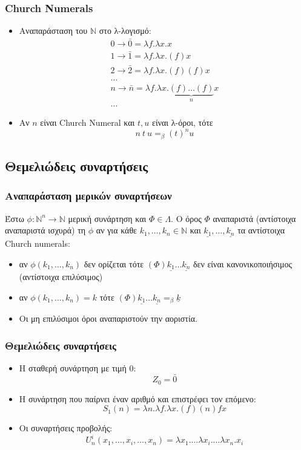 \documentclass{beamer}
\begin{document}
\begin{frame}
  \frametitle{Church Numerals}
  \begin{itemize}
  \item Αναπαράσταση του $ \mathbb{N} $ στο λ-λογισμό:
    \pause
    $$
    \begin{array}{l}
      0 \rightarrow \bar{0} = \lambda f . \lambda x . x \\
      1 \rightarrow \bar{1} = \lambda f . \lambda x . (f) x \\
      2 \rightarrow \bar{2} = \lambda f . \lambda x . (f) (f) x \\
      \ldots \\
      n \rightarrow \bar{n} = \lambda f . \lambda x . \underbrace{(f)
        \ldots (f)}_n x \\
      \ldots
    \end{array}
    $$
    \pause
  \item Αν $n $ είναι Church Numeral και $t, u$ είναι λ-όροι, τότε
    $$ n\:t\:u =_\beta (t)^n u $$
  \end{itemize}
\end{frame}

\subsection{Θεμελιώδεις συναρτήσεις}

\begin{frame}
  \frametitle{Αναπαράσταση μερικών συναρτήσεων}
  Έστω $\phi : \mathbb{N}^n \rightarrow \mathbb{N}$ μερική συνάρτηση
  και $\Phi \in \Lambda $. O όρος $\Phi$ αναπαριστά (αντίστοιχα
  αναπαριστά ισχυρά) τη $\phi$ αν για κάθε $k_1,\ldots, k_n \in
  \mathbb{N}$ και $ \underline{k_1}, \ldots, \underline{k_n}$ τα
  αντίστοιχα Church numerals: \pause
  \begin{itemize}
  \item αν $\phi(k_1,\ldots,k_n)$ δεν ορίζεται τότε $(\Phi)
    \underline{k_1} \ldots \underline{k_n}$ δεν είναι
    κανονικοποιήσιμος (αντίστοιχα επιλύσιμος) \pause
  \item αν $\phi(k_1,\ldots,k_n) = k$ τότε $(\Phi) \underline{k_1}
    \ldots \underline{k_n} =_\beta \underline{k}$ \pause
  \item Οι μη επιλύσιμοι όροι αναπαριστούν την αοριστία.
  \end{itemize}
\end{frame}

\begin{frame}
  \frametitle{Θεμελιώδεις συναρτήσεις}
  \begin{itemize}
  \item Η σταθερή συνάρτηση με τιμή 0:
    $$Z_0=\bar{0}$$
    \pause
  \item Η συνάρτηση που παίρνει έναν αριθμό και επιστρέφει τον
    επόμενο:
    $$S_1(n)=\lambda n . \lambda f . \lambda x . (f) (n) f x$$
    \pause
  \item Οι συναρτήσεις προβολής: $$U^i_n(x_1,\ldots,x_i,\ldots,x_n)=
    \lambda x_1 . \ldots \lambda x_i . \ldots \lambda x_n . x_i$$
  \end{itemize}
\end{frame}
\end{document}
